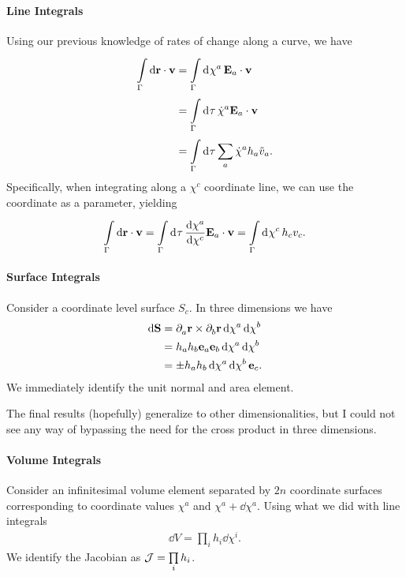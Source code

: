 \paragraph{Line Integrals}
Using our previous knowledge of rates of change along a curve, we have
\begin{align*}
	\int\limits_{\Gamma}^{}\dd{\vb{r}}\cdot \vb{v} &= \int\limits_{\Gamma}^{}\dd[]{\chi^{a}}\vb{E}_{a}\cdot\vb{v} \\
	                             &= \int\limits_{\Gamma}^{}\dd[]{\tau}\dot{\chi}^{a}\vb{E}_{a}\cdot\vb{v} \\
	                             &= \int\limits_{\Gamma}^{}\dd[]{\tau}\sum\limits_{a}\dot{\chi}^{a}h_{a}\tilde{v}_{a}.
\end{align*}
Specifically, when integrating along a $\chi^{c}$ coordinate line, we can use the coordinate as a parameter, yielding
\begin{align*}
	\int\limits_{\Gamma}^{}\dd{\vb{r}}\cdot \vb{v} = \int\limits_{\Gamma}^{}\dd[]{\tau}\dv{\chi^{a}}{\chi^{c}}\vb{E}_{a}\cdot\vb{v} = \int\limits_{\Gamma}^{}\dd[]{\chi^{c}}h_{c}v_{c}.
\end{align*}

\paragraph{Surface Integrals}
Consider a coordinate level surface $S_{c}$. In three dimensions we have
\begin{align*}
	\dd{\vb{S}} &= \partial^{}_{a}\vb{r}\times\partial^{}_{b}\vb{r}\dd{\chi^{a}}\dd{\chi^{b}} \\
	            &= h_{a}h_{b}\vb{e}_{a}\vb{e}_{b}\dd{\chi^{a}}\dd{\chi^{b}} \\
	            &= \pm h_{a}h_{b}\dd{\chi^{a}}\dd{\chi^{b}}\vb{e}_{c}.
\end{align*}
We immediately identify the unit normal and area element.

The final results (hopefully) generalize to other dimensionalities, but I could not see any way of bypassing the need for the cross product in three dimensions.

\paragraph{Volume Integrals}
Consider an infinitesimal volume element separated by $2n$ coordinate surfaces corresponding to coordinate values $\chi^{a}$ and $\chi^{a} + \dd{\chi^{a}}$. Using what we did with line integrals
\begin{align*}
	\dd{V} = \prod\limits_{i}h_{i}\dd{\chi^{i}}.
\end{align*}
We identify the Jacobian as $\mathcal{J} = \prod\limits_{i}h_{i}$.